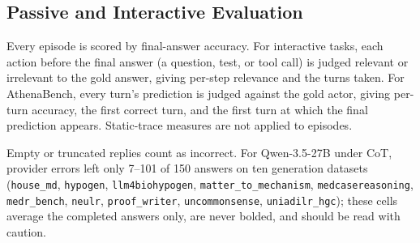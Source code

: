 \subsection{Passive and Interactive Evaluation}
\label{sec:sequential_interactive_evaluation}

Every episode is scored by final-answer accuracy. For interactive tasks, each action before the final answer (a question, test, or tool call) is judged relevant or irrelevant to the gold answer, giving per-step relevance and the turns taken. For AthenaBench, every turn's prediction is judged against the gold actor, giving per-turn accuracy, the first correct turn, and the first turn at which the final prediction appears. Static-trace measures are not applied to episodes.

Empty or truncated replies count as incorrect. For Qwen-3.5-27B under CoT, provider errors left only 7--101 of 150 answers on ten generation datasets (\texttt{house\_md}, \texttt{hypogen}, \texttt{llm4biohypogen}, \texttt{matter\_to\_mechanism}, \texttt{medcasereasoning}, \texttt{medr\_bench}, \texttt{neulr}, \texttt{proof\_writer}, \texttt{uncommonsense}, \texttt{uniadilr\_hgc}); these cells average the completed answers only, are never bolded, and should be read with caution.


